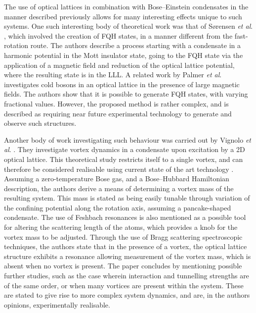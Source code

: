 The use of optical lattices in combination with Bose--Einstein condensates in the manner described previously allows for many interesting effects unique to such systems. One such interesting body of theoretical work was that of S{\o}rensen \textit{et al}. \cite{OL:Sorensen_prl_2005}, which involved the creation of FQH states, in a manner different from the fast-rotation route. The authors describe a process starting with a condensate in a harmonic potential in the Mott insulator state, going to the FQH state via the application of a magnetic field and reduction of the optical lattice potential, where the resulting state is in the LLL. A related work by Palmer \textit{et al}. \cite{OL:Palmer_prl_2006} investigates cold bosons in an optical lattice in the presence of large magnetic fields. The authors show that it is possible to generate FQH states, with varying fractional values. However, the proposed method is rather complex, and is described as requiring near future experimental technology to generate and observe such structures.

Another body of work investigating such behaviour was carried out by Vignolo \textit{et al}. \cite{Vtx:Vignolo_pra_2007}. They investigate vortex dynamics in a condensate upon excitation by a 2D optical lattice. This theoretical study restricts itself to a single vortex, and can therefore be considered realisable using current state of the art technology \cite{Vtx:Matthews_prl_1999,Vtx:Dobrek_pra_1999,Vtx:Tung_prl_2006}. Assuming a zero-temperature Bose gas, and a Bose--Hubbard Hamiltonian description, the authors derive a means of determining a vortex mass of the resulting system. This mass is stated as being easily tunable through variation of the confining potential along the rotation axis, assuming a pancake-shaped condensate. The use of Feshbach resonances \cite{BEC:Chin_revmod_2010} is also mentioned as a possible tool for altering the scattering length of the atoms, which provides a knob for the vortex mass to be adjusted. Through the use of Bragg scattering spectroscopic techniques, the authors state that in the presence of a vortex, the optical lattice structure exhibits a resonance allowing measurement of the vortex mass, which is absent when no vortex is present. The paper concludes by mentioning possible further studies, such as the case wherein interaction and tunnelling strengths are of the same order, or when many vortices are present within the system. These are stated to give rise to more complex system dynamics, and are, in the authors opinions, experimentally realisable.

